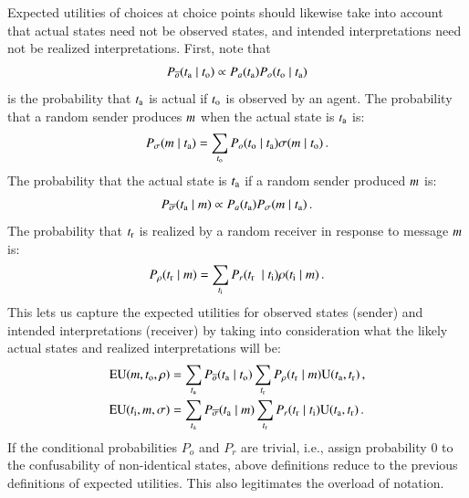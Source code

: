 \documentclass[fleqn,reqno,10pt]{article}
\begin{document}
Expected utilities of choices at choice points should likewise take into account that actual states
need not be observed states, and intended interpretations need not be realized
interpretations. First, note that
\begin{align*}
  P_{\overline{o}}(t_{\mathrm{a}} \mid t_{\mathrm{o}}) \propto P_a(t_{\mathrm{a}}) P_o(t_{\mathrm{o}}
    \mid t_{\mathrm{a}})
\end{align*}
is the probability that $t_{\mathrm{a}}$ is actual if $t_{\mathrm{o}}$ is observed by an agent. The
probability that a random sender produces $m$ when the actual state is $t_{\mathrm{a}}$ is:
\begin{align*}
  P_{\sigma}(m \mid t_{\mathrm{a}}) = \sum_{t_{\mathrm{o}}} P_o(t_{\mathrm{o}} \mid
  t_{\mathrm{a}}) \sigma(m \mid t_{\mathrm{o}})\,. 
\end{align*}
The probability that the actual state is $t_{\mathrm{a}}$ if a random sender produced $m$ is:
\begin{align*}
  P_{\overline{\sigma}}(t_{\mathrm{a}} \mid m) \propto P_a(t_{\mathrm{a}})
  P_{\sigma}(m \mid t_{\mathrm{a}})\,. 
\end{align*}
The probability that $t_{\mathrm{r}}$ is realized by a random receiver in response to
message $m$ is:
\begin{align*}
  P_{\rho}(t_{\mathrm{r}} \mid m) = \sum_{t_{\mathrm{i}}} P_r(t_{\mathrm{r}} \ \mid
  t_{\mathrm{i}}) \rho(t_{\mathrm{i}} \mid m)\,.
\end{align*}
This lets us capture the expected utilities for observed states (sender) and intended
interpretations (receiver) by taking into consideration what the likely actual states and
realized interpretations will be:
\begin{align*}
  \mathrm{EU}(m , t_{\mathrm{o}}, \rho) & = \sum_{t_{\mathrm{a}}} P_{\overline{o}}(t_{\mathrm{a}}
  \mid t_{\mathrm{o}}) \sum_{t_{\mathrm{r}}} P_{\rho}(t_{\mathrm{r}} \mid
  m) \mathrm{U}(t_{\mathrm{a}}, t_{\mathrm{r}})\,, \\
  \mathrm{EU}(t_{\mathrm{i}}, m, \sigma) & = \sum_{t_{\mathrm{a}}} P_{\overline{\sigma}}(t_{\mathrm{a}}
  \mid m) \sum_{t_{\mathrm{r}}} P_{r}(t_{\mathrm{r}} \mid t_{\mathrm{i}})
  \mathrm{U}(t_{\mathrm{a}}, t_{\mathrm{r}})\,.
\end{align*}
If the conditional probabilities $P_o$ and $P_r$ are trivial, i.e., assign probability 0 to the
confusability of non-identical states, above definitions reduce to the
previous definitions of expected utilities. This also legitimates the overload of notation.
\end{document}
